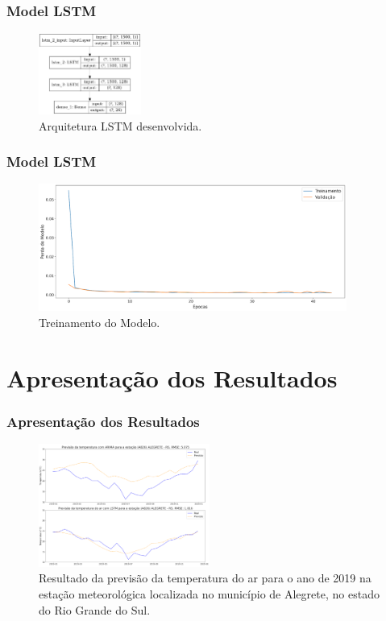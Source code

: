 \documentclass[aspectratio=169]{beamer}
\begin{document}
\begin{frame}
\frametitle{Model LSTM}

\begin{figure}[H]
\centering
\caption{Arquitetura LSTM desenvolvida.}
\includegraphics[width=0.3\textwidth]{figuras/lstm_model.png}
\end{figure}

\end{frame}


\begin{frame}
\frametitle{Model LSTM}

\begin{figure}[H]
\centering
\caption{Treinamento do Modelo.}
\includegraphics[width=0.9\textwidth]{figuras/lstm_perda_modelo.png}
\end{figure}

\end{frame}


\section{Apresentação dos Resultados}

\begin{frame}
\frametitle{Apresentação dos Resultados}

\begin{figure}[H]
\centering
\caption{Resultado da previsão da temperatura do ar para o ano de 2019 na estação meteorológica localizada no município de Alegrete, no estado do Rio Grande do Sul.}
\includegraphics[width=0.5\textwidth]{figuras/resultados_1.png}
\end{figure}

\end{frame}
\end{document}
